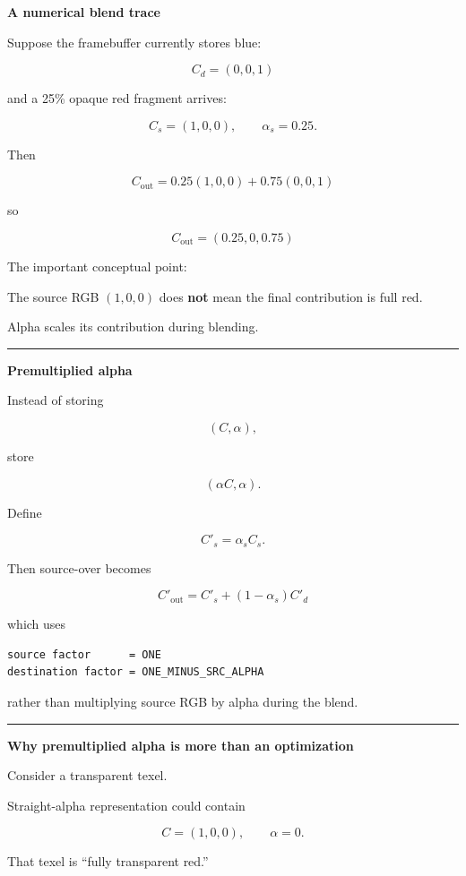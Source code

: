 \textbf{A numerical blend trace}

Suppose the framebuffer currently stores blue:

\[
C_d=(0,0,1)
\]

and a 25\% opaque red fragment arrives:

\[
C_s=(1,0,0),\qquad \alpha_s=0.25.
\]

Then

\[
C_{\text{out}}
=
0.25(1,0,0)
+
0.75(0,0,1)
\]

so

\[
\boxed{
C_{\text{out}}
=
(0.25,0,0.75)
}
\]

The important conceptual point:

The source RGB \((1,0,0)\) does \textbf{not} mean the final contribution is full red.

Alpha scales its contribution during blending.

\begin{center}\rule{0.5\linewidth}{0.5pt}\end{center}

\textbf{Premultiplied alpha}

Instead of storing

\[
(C,\alpha),
\]

store

\[
(\alpha C,\alpha).
\]

Define

\[
C'_s=\alpha_s C_s.
\]

Then source-over becomes

\[
\boxed{
C'_{\text{out}}
=
C'_s+(1-\alpha_s)C'_d
}
\]

which uses

\begin{verbatim}
source factor      = ONE
destination factor = ONE_MINUS_SRC_ALPHA
\end{verbatim}

rather than multiplying source RGB by alpha during the blend.

\begin{center}\rule{0.5\linewidth}{0.5pt}\end{center}

\textbf{Why premultiplied alpha is more than an optimization}

Consider a transparent texel.

Straight-alpha representation could contain

\[
C=(1,0,0),\qquad \alpha=0.
\]

That texel is ``fully transparent red.''

